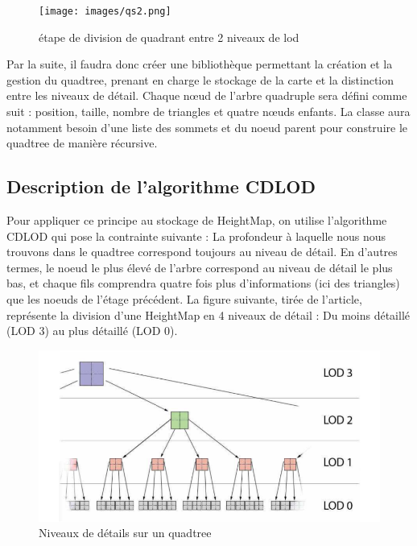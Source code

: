 \documentclass[12pt]{report}
\begin{document}
\begin{figure}[h]
    \begin{center}
    \texttt{[image: images/qs2.png]}
    \caption{étape de division de quadrant entre 2 niveaux de lod}
    \end{center}
\end{figure}

\newpage

Par la suite, il faudra donc créer une bibliothèque permettant la création et la gestion du quadtree, prenant en charge le stockage de la carte et la distinction entre les niveaux de détail. Chaque nœud de l'arbre quadruple sera défini comme suit : position, taille, nombre de triangles et quatre nœuds enfants. La classe aura notamment besoin d'une liste des sommets et du noeud parent pour construire le quadtree de manière récursive. 


\subsection{Description de l'algorithme CDLOD}

Pour appliquer ce principe au stockage de HeightMap, on utilise l'algorithme CDLOD qui pose la contrainte suivante : La profondeur à laquelle nous nous trouvons dans le quadtree correspond toujours au niveau de détail. En d'autres termes, le noeud le plus élevé de l'arbre correspond au niveau de détail le plus bas, et chaque fils comprendra quatre fois plus d'informations (ici des triangles) que les noeuds de l'étage précédent. La figure suivante, tirée de l'article, représente la division d'une HeightMap en 4 niveaux de détail : Du moins détaillé (LOD 3) au plus détaillé (LOD 0).

\vspace{0.3cm}

\begin{figure}[h]
    \begin{center}
    \includegraphics[scale = 0.8]{images/CDLOD1.png}
    \caption{Niveaux de détails sur un quadtree}
    \end{center}
\end{figure}
\end{document}

